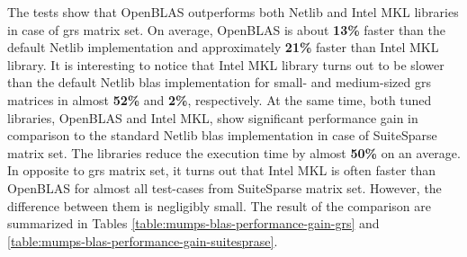 The tests show that OpenBLAS outperforms both Netlib and Intel MKL libraries in case of \acrshort{grs} matrix set. On average, OpenBLAS is about \textbf{13\%} faster than the default Netlib implementation and approximately \textbf{21\%} faster than Intel MKL library. It is interesting to notice that Intel MKL library turns out to be slower than the default Netlib \acrshort{blas} implementation for small- and medium-sized \acrshort{grs} matrices in almost \textbf{52\%} and \textbf{2\%}, respectively. At the same time, both tuned libraries, OpenBLAS and Intel MKL, show significant performance gain in comparison to the standard Netlib \acrshort{blas} implementation in case of SuiteSparse matrix set. The libraries reduce the execution time by almost \textbf{50\%} on an average. In opposite to \acrshort{grs} matrix set, it turns out that Intel MKL is often faster than OpenBLAS for almost all test-cases from SuiteSparse matrix set. However, the difference between them is negligibly small. The result of the comparison are summarized in Tables \ref{table:mumps-blas-performance-gain-grs} and \ref{table:mumps-blas-performance-gain-suitesprase}.\\


